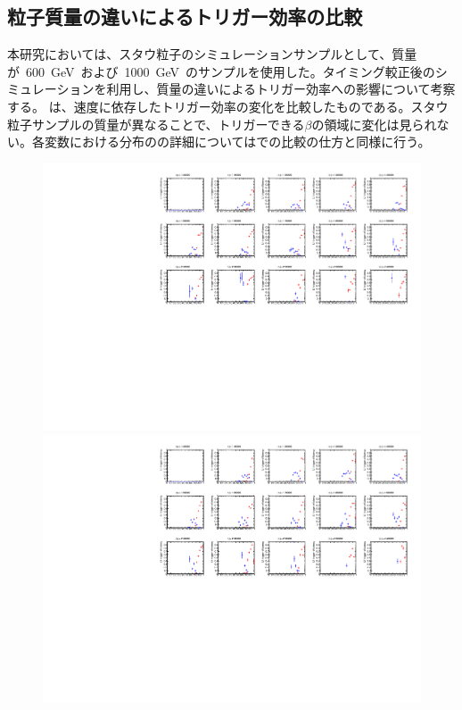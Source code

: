 \subsection{粒子質量の違いによるトリガー効率の比較}\label{sec:trimass}
本研究においては、スタウ粒子のシミュレーションサンプルとして、質量が~600~GeV~および~1000~GeV~のサンプルを使用した。タイミング較正後のシミュレーションを利用し、質量の違いによるトリガー効率への影響について考察する。
は、速度に依存したトリガー効率の変化を比較したものである。スタウ粒子サンプルの質量が異なることで、トリガーできる$\beta$の領域に変化は見られない。各変数における分布のの詳細についてはでの比較の仕方と同様に行う。
\begin{figure}[H]
    \begin{minipage}{0.49\hsize}
    \centering   
    \includegraphics[width=\textwidth,page=2]{img/rec/stau_600.pdf}
    \subcaption{}
    \end{minipage}
    \begin{minipage}{0.49\hsize}
    \centering   
    \includegraphics[width=\textwidth,page=2]{img/rec/stau_1000.pdf}

\end{minipage}
\end{figure}
